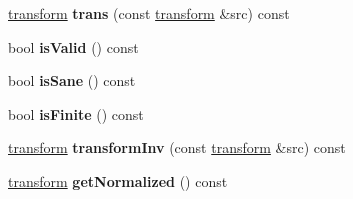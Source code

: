 \begin{DoxyCompactItemize}
\item 
\hypertarget{classmath_1_1transform_aac85fac3bbd90679a2d43511f24bdd42}{
\hyperlink{classmath_1_1transform}{transform} {\bfseries trans} (const \hyperlink{classmath_1_1transform}{transform} \&src) const }
\label{classmath_1_1transform_aac85fac3bbd90679a2d43511f24bdd42}

\item 
\hypertarget{classmath_1_1transform_ac31f73479d89e0401f44b59b243ddacd}{
bool {\bfseries isValid} () const }
\label{classmath_1_1transform_ac31f73479d89e0401f44b59b243ddacd}

\item 
\hypertarget{classmath_1_1transform_a7a6602be4a1c9eb4fb20514c5eee965b}{
bool {\bfseries isSane} () const }
\label{classmath_1_1transform_a7a6602be4a1c9eb4fb20514c5eee965b}

\item 
\hypertarget{classmath_1_1transform_a92670298b2affc9daf52716076d6cbdc}{
bool {\bfseries isFinite} () const }
\label{classmath_1_1transform_a92670298b2affc9daf52716076d6cbdc}

\item 
\hypertarget{classmath_1_1transform_aafec67428664ec08699ed2b06ffec04a}{
\hyperlink{classmath_1_1transform}{transform} {\bfseries transformInv} (const \hyperlink{classmath_1_1transform}{transform} \&src) const }
\label{classmath_1_1transform_aafec67428664ec08699ed2b06ffec04a}

\item 
\hypertarget{classmath_1_1transform_a22d5670f272e14ba4a392220a6d9fbc4}{
\hyperlink{classmath_1_1transform}{transform} {\bfseries getNormalized} () const }
\label{classmath_1_1transform_a22d5670f272e14ba4a392220a6d9fbc4}

\end{DoxyCompactItemize}
